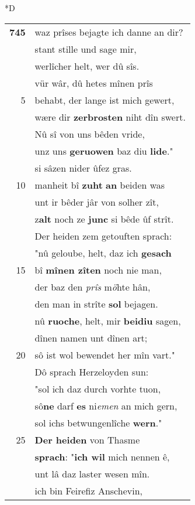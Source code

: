 \documentclass[8pt,a4paper,notitlepage]{article}
\begin{document}
\begin{table}[ht]
\begin{minipage}[t]{0.5\linewidth}
\small
\begin{center}*D
\end{center}
\begin{tabular}{rl}
\textbf{745} & waz prîses bejagte ich danne an dir?\\ 
 & stant stille und sage mir,\\ 
 & werlîcher helt, wer dû sîs.\\ 
 & vür wâr, dû hetes mînen prîs\\ 
5 & behabt, der lange ist mich gewert,\\ 
 & wære dir \textbf{zerbrosten} niht dîn swert.\\ 
 & Nû sî von uns bêden vride,\\ 
 & unz uns \textbf{geruowen} baz diu \textbf{lide}."\\ 
 & si sâzen nider ûfez gras.\\ 
10 & manheit bî \textbf{zuht} \textbf{an} beiden was\\ 
 & unt ir bêder jâr von solher zît,\\ 
 & z\textbf{alt} noch ze \textbf{junc} si bêde ûf strît.\\ 
 & Der heiden zem getouften sprach:\\ 
 & "nû geloube, helt, daz ich \textbf{gesach}\\ 
15 & bî \textbf{mînen zîten} noch nie man,\\ 
 & der baz den \textit{prîs} m\textit{ö}hte hân,\\ 
 & den man in strîte \textbf{sol} bejagen.\\ 
 & nû \textbf{ruoche}, helt, mir \textbf{beidiu} sagen,\\ 
 & dînen namen unt dînen art;\\ 
20 & sô ist wol bewendet her mîn vart."\\ 
 & Dô sprach Herzeloyden sun:\\ 
 & "sol ich daz durch vorhte tuon,\\ 
 & sô\textbf{ne} darf \textbf{es} ni\textit{emen} an mich gern,\\ 
 & sol ichs betwungenlîche \textbf{wern}."\\ 
25 & \textbf{Der heiden} von Thasme\\ 
 & \textbf{sprach}: "\textbf{ich wil} mich nennen ê,\\ 
 & unt lâ daz laster wesen mîn.\\ 
 & ich bin Feirefiz Anschevin,\\ 

\end{tabular}
\end{minipage}
\end{table}
\end{document}
